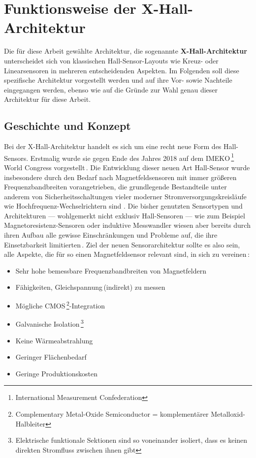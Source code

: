 \documentclass[12pt, a4paper]{article}
\begin{document}
\section{Funktionsweise der X-Hall-Architektur}
Die für diese Arbeit gewählte Architektur, die sogenannte \textbf{X-Hall-Architektur} unterscheidet sich von klassischen Hall-Sensor-Layouts wie Kreuz- oder Linearsensoren in mehreren entscheidenden Aspekten. Im Folgenden soll diese spezifische Architektur vorgestellt werden und auf ihre Vor- sowie Nachteile eingegangen werden, ebenso wie auf die Gründe zur Wahl genau dieser %
Architektur für diese Arbeit.

\subsection{Geschichte und Konzept}
Bei der X-Hall-Architektur handelt es sich um eine recht neue Form des Hall-Sensors. Erstmalig wurde sie gegen Ende des Jahres 2018 auf dem IMEKO\,\footnote{International Measurement Confederation} 
World Congress vorgestellt\,\cite{cres19}. \newline
Die Entwicklung dieser neuen Art Hall-Sensor wurde insbesondere durch den Bedarf nach Magnetfeldsensoren mit immer größeren Frequenzbandbreiten vorangetrieben, die grundlegende Bestandteile unter anderem von Sicherheitsschaltungen vieler moderner Stromversorgungskreisläufe wie Hochfrequenz-Wechselrichtern sind\,\cite{cres18}\,\cite{cres21}. Die bisher genutzten Sensortypen und Architekturen --- wohlgemerkt nicht exklusiv Hall-Sensoren --- wie zum Beispiel Magnetoresistenz-Sensoren oder induktive Messwandler wiesen aber bereits durch ihren Aufbau alle gewisse Einschränkungen und Probleme auf, die ihre Einsetzbarkeit limitierten\,\cite{cres21}. \newline
Ziel der neuen Sensorarchitektur sollte es also sein, alle Aspekte, die für so einen Magnetfeldsensor relevant sind, in sich zu vereinen\,\cite{cres19}: 
\begin{itemize}
	\item Sehr hohe bemessbare Frequenzbandbreiten von Magnetfeldern %
	\item Fähigkeiten, Gleichspannung\,(indirekt) zu messen
	\item Mögliche CMOS\,\footnote{Complementary Metal-Oxide Semiconductor = komplementärer Metalloxid-Halbleiter}-Integration
	\item Galvanische Isolation\,\footnote{Elektrische funktionale Sektionen sind so voneinander isoliert, dass es keinen direkten Stromfluss zwischen ihnen gibt}
	\item Keine Wärmeabstrahlung
	\item Geringer Flächenbedarf %
	\item Geringe Produktionskosten
\end{itemize} 
\end{document}
